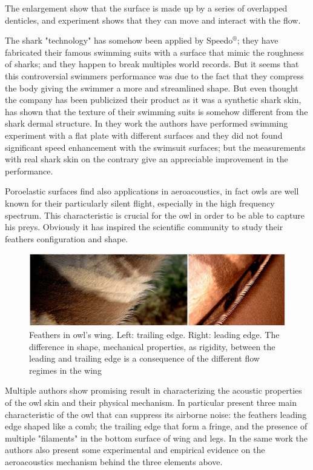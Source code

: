 The enlargement show that the surface is made up by a series of overlapped denticles, and experiment shows that they can move and interact with the flow.

The shark "technology" has somehow been applied by Speedo$^{\circledR}$; they have fabricated their famous swimming suits with a surface that mimic the roughness of sharks; and they happen to break multiples world records.
But it seems that this controversial swimmers performance was due to the fact that they compress the body giving the swimmer a more and streamlined shape.
But even thought the company has been publicized their product as it was a synthetic shark skin, \citet{Oeffner785} has shown that the texture of their swimming suits is somehow different from the shark dermal structure.
In they work the authors have performed swimming experiment with a flat plate with different surfaces and they did not found significant speed enhancement with the swimsuit surfaces; but the measurements with real shark skin on the contrary give an appreciable improvement in the performance.


Poroelastic surfaces find also applications in aeroacoustics, in fact owls are well known for their particularly silent flight, especially in the high frequency spectrum.
This characteristic is crucial for the owl in order to be able to capture his preys.
Obviously it has inspired the scientific community to study their feathers configuration and shape.

\begin{figure}[h]
	\centering
	\includegraphics[width=0.8\linewidth]{chapter_1/howl}
	\caption{Feathers in owl's wing. Left: trailing edge. Right: leading edge. The difference in shape, mechanical properties, as rigidity, between the leading and trailing edge is a consequence of the different flow regimes in the wing}
	\label{fig:owl}
\end{figure}
 
Multiple authors show promising result in characterizing the acoustic properties of the owl skin and their physical mechanism.
In particular \citet{lilley1998} present three main characteristic of the owl that can suppress its airborne noise: the feathers leading edge shaped like a comb; the trailing edge that form a fringe, and the presence of multiple "filaments" in the bottom surface of wing and legs.
In the same work the authors also present some experimental and empirical evidence on the aeroacoustics mechanism behind the three elements above.

